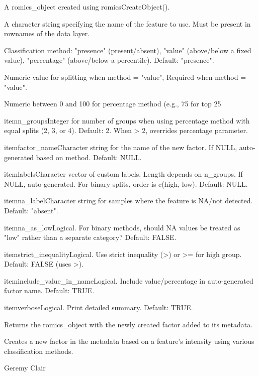 \documentclass[a4paper]{book}
\begin{document}
\begin{Arguments}
\begin{ldescription}
\item[\code{romics\_object}] A romics\_object created using romicsCreateObject().

\item[\code{feature}] A character string specifying the name of the feature to use. Must be present in rownames of the data layer.

\item[\code{method}] Classification method: "presence" (present/absent), "value" (above/below a fixed value), "percentage" (above/below a percentile). Default: "presence".

\item[\code{value}] Numeric value for splitting when method = "value", Required when method = "value".

\item[\code{percentage}] Numeric between 0 and 100 for percentage method (e.g., 75 for top 25

\bsl{}itemn\_groupsInteger for number of groups when using percentage method with equal splits (2, 3, or 4). Default: 2. When > 2, overrides percentage parameter.

\bsl{}itemfactor\_nameCharacter string for the name of the new factor. If NULL, auto-generated based on method. Default: NULL.

\bsl{}itemlabelsCharacter vector of custom labels. Length depends on n\_groups. If NULL, auto-generated. For binary splits, order is c(high, low). Default: NULL.

\bsl{}itemna\_labelCharacter string for samples where the feature is NA/not detected. Default: "absent".

\bsl{}itemna\_as\_lowLogical. For binary methods, should NA values be treated as "low" rather than a separate category? Default: FALSE.

\bsl{}itemstrict\_inequalityLogical. Use strict inequality (>) or >= for high group. Default: FALSE (uses >).

\bsl{}iteminclude\_value\_in\_nameLogical. Include value/percentage in auto-generated factor name. Default: TRUE.

\bsl{}itemverboseLogical. Print detailed summary. Default: TRUE.

\end{ldescription}

Returns the romics\_object with the newly created factor added to its metadata.


Creates a new factor in the metadata based on a feature's intensity using various classification methods.


Geremy Clair

\end{Arguments}
\end{document}
